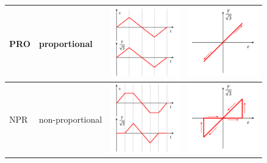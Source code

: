 \documentclass[preprint,5p,twocolumn,10pt,sort&compress]{elsarticle}
\begin{document}
\begin{table}[!ht]
\begin{tabular}{p{2.0cm}p{4.0cm}p{4cm}p{4cm}}
    PRO    & proportional  & \begin{minipage}{0.1\textwidth}\includegraphics[width=3cm]{load_path_3_time.pdf}\end{minipage}  & \begin{minipage}{0.1\textwidth}\includegraphics[width=3cm]{load_path_3.pdf}\end{minipage} \\
	\midrule
    NPR    & non-proportional  & \begin{minipage}{0.1\textwidth}\includegraphics[width=3cm]{load_path_4_time.pdf}\end{minipage}  & \begin{minipage}{0.1\textwidth}\includegraphics[width=3cm]{load_path_4.pdf}\end{minipage} \\
    \bottomrule
    \end{tabular}%
  \label{Tab:LoadPath}%
\end{table}%
\end{document}
